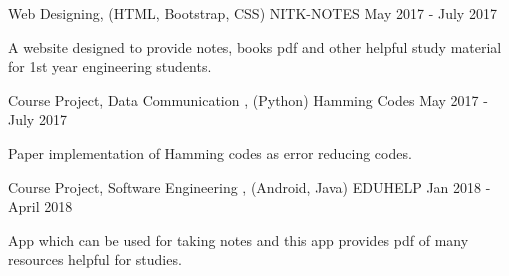 \documentclass[11pt, a4paper]{awesome-cv}
\begin{document}


\begin{cventries}

  \cventry
    {Web Designing, (HTML, Bootstrap, CSS)} %
    {NITK-NOTES} %
    {} %
    {May 2017 - July 2017} %
    {
      \begin{cvitems} %
        \item {A website designed to provide notes, books pdf and other helpful study material for 1st year engineering students.}
      \end{cvitems}
    }

\end{cventries}

\begin{cventries}

  \cventry
    {Course Project, Data Communication , (Python) } %
    {Hamming Codes} %
    {} %
    {May 2017 - July 2017} %
    {
      \begin{cvitems} %
        \item {Paper implementation of Hamming codes as error reducing codes.}
      \end{cvitems}
    }

\end{cventries}

\begin{cventries}

  \cventry
    {Course Project, Software Engineering , (Android, Java) } %
    {EDUHELP} %
    {} %
    {Jan 2018 - April 2018} %
    {
      \begin{cvitems} %
        \item {App which can be used for taking notes and this app
provides pdf of many resources helpful for studies.}
      \end{cvitems}
    }

\end{cventries}
\end{document}
